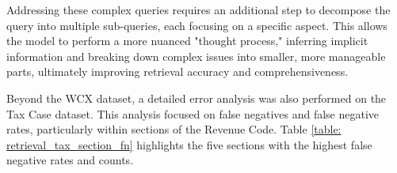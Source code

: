

Addressing these complex queries requires an additional step to decompose the query into multiple sub-queries, each focusing on a specific aspect. This allows the model to perform a more nuanced "thought process," inferring implicit information and breaking down complex issues into smaller, more manageable parts, ultimately improving retrieval accuracy and comprehensiveness.


Beyond the WCX dataset, a detailed error analysis was also performed on the Tax Case dataset. This analysis focused on false negatives and false negative rates, particularly within sections of the Revenue Code. Table \ref{table: retrieval_tax_section_fn} highlights the five sections with the highest false negative rates and counts.

